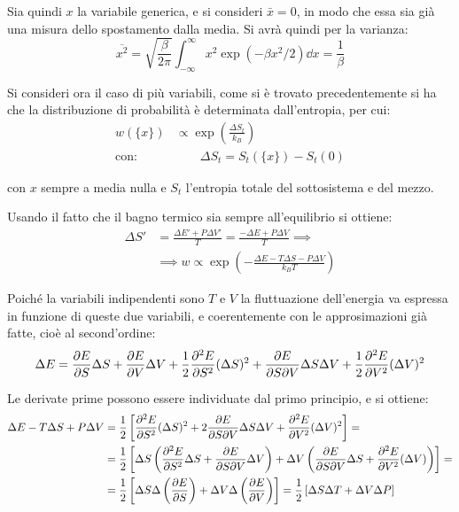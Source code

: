 Sia quindi $x$ la variabile generica, e si consideri $\bar{x} = 0$, in modo che essa sia già una misura dello spostamento dalla media. Si avrà quindi per la varianza:
\begin{equation*}
\overline{x^2} = \sqrt{\frac{\beta}{2\pi}} \int_{-\infty}^\infty x^2 \exp (-\beta x^2 /2) \dd x = \frac{1}{\beta}
\end{equation*}

Si consideri ora il caso di più variabili, come si è trovato precedentemente si ha che la distribuzione di probabilità è determinata dall'entropia, per cui:
\begin{align*}
w(\{x\}) &\propto \exp  \left(\frac{\Delta S_t}{k_B} \right) \\
\text{con:} &\qquad \Delta S_t = S_t(\{x\}) - S_t(0)
\end{align*}

\noindent con $x$ sempre a media nulla e $S_t$ l'entropia totale del sottosistema e del mezzo. 

Usando il fatto che il bagno termico sia sempre all'equilibrio si ottiene:
\begin{align*}
\Delta S' &= \frac{\Delta E' + P \Delta V'}{T} = \frac{- \Delta E + P \Delta V}{T} \implies\\
&\implies w \propto \exp \left( - \frac{\Delta E - T \Delta S - P \Delta V}{k_B T}\right)
\end{align*}

Poiché la variabili indipendenti sono $T$ e $V$ la fluttuazione dell'energia va espressa in funzione di queste due variabili, e coerentemente con le approsimazioni già fatte, cioè al second'ordine:
\begin{equation*}
\Delta E = \frac{\partial {E}}{\partial {S}} \Delta S + \frac{\partial {E}}{\partial {V}} \Delta V + \frac{1}{2} \frac{\partial {^2 E}}{\partial {S^2}} (\Delta S)^2 + \frac{\partial {E}}{\partial {S \partial V}} \Delta S \Delta V + \frac{1}{2} \frac{\partial {^2 E}}{\partial {V^2}} (\Delta V)^2
\end{equation*}

\noindent Le derivate prime possono essere individuate dal primo principio, e si ottiene:
\begin{align*}
\Delta E - T \Delta S + P \Delta V &= \frac{1}{2} \left[\frac{\partial {^2 E}}{\partial {S^2}} (\Delta S)^2 + 2 \frac{\partial {E}}{\partial {S \partial V}} \Delta S \Delta V + \frac{\partial {^2 E}}{\partial {V^2}} (\Delta V)^2\right] =\\
&=\frac{1}{2} \left[\Delta S \left(\frac{\partial {^2 E}}{\partial {S^2}} \Delta S + \frac{\partial {E}}{\partial {S \partial V}} \Delta V\right) + \Delta V  \left(\frac{\partial {E}}{\partial {S \partial V}} \Delta S + \frac{\partial {^2 E}}{\partial {V^2}} (\Delta V)\right)\right] =\\
&= \frac{1}{2} \left[\Delta S \Delta \left(\frac{\partial {E}}{\partial {S}}\right) + \Delta V \Delta \left(\frac{\partial {E}}{\partial {V}}\right)\right] = \frac{1}{2} \left[\Delta S \Delta T + \Delta V \Delta P\right]
\end{align*}


